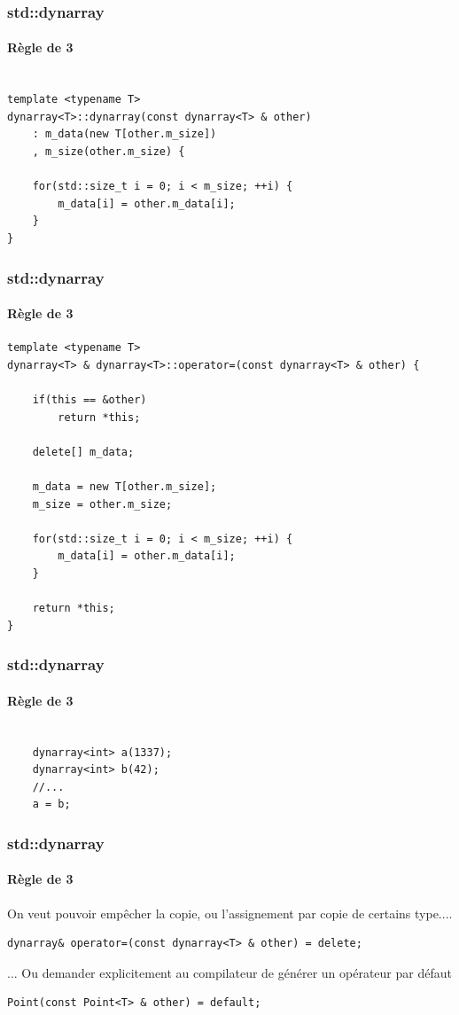 \documentclass[xetex,mathserif]{beamer}
\begin{document}
\begin{frame}[containsverbatim]
\frametitle{std::dynarray}
\framesubtitle{Règle de 3}
\begin{lstlisting} 

template <typename T>
dynarray<T>::dynarray(const dynarray<T> & other)
	: m_data(new T[other.m_size])
	, m_size(other.m_size) {
	
	for(std::size_t i = 0; i < m_size; ++i) {
		m_data[i] = other.m_data[i];
	}
}
\end{lstlisting}
\end{frame}


\begin{frame}[containsverbatim]
\frametitle{std::dynarray}
\framesubtitle{Règle de 3}
\begin{lstlisting} 
template <typename T>
dynarray<T> & dynarray<T>::operator=(const dynarray<T> & other) {

	if(this == &other)
		return *this;
	
	delete[] m_data;
	
	m_data = new T[other.m_size];
	m_size = other.m_size;
	
	for(std::size_t i = 0; i < m_size; ++i) {
		m_data[i] = other.m_data[i];
	}
	
	return *this;
}
\end{lstlisting}
\end{frame}

\begin{frame}[containsverbatim]
\frametitle{std::dynarray}
\framesubtitle{Règle de 3}

\begin{lstlisting} 

	dynarray<int> a(1337);
	dynarray<int> b(42);	
	//...
	a = b;

\end{lstlisting}
\end{frame}



\begin{frame}[fragile]
\frametitle{std::dynarray}
\framesubtitle{Règle de 3}

On veut pouvoir empêcher la copie, ou l'assignement par copie de certains type....
\begin{lstlisting}
dynarray& operator=(const dynarray<T> & other) = delete;
\end{lstlisting}

\pause
... Ou demander explicitement au compilateur de générer un opérateur par défaut

\begin{lstlisting}
Point(const Point<T> & other) = default;
\end{lstlisting}

\end{frame}
\end{document}
